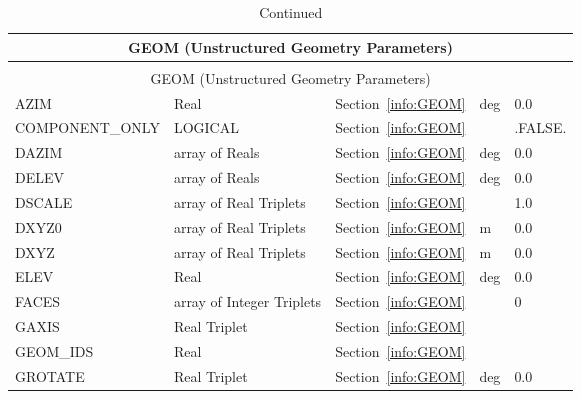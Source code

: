\documentclass[12pt]{article}
\begin{document}
\begin{longtable}{@{\extracolsep{\fill}}|l|l|l|l|l|}
\caption[Unstructured geometry parameters ({\ct GEOM} namelist group)]{For more information see Section~\ref{info:GEOM}.}
\label{tbl:GEOM} \\
\hline
\multicolumn{5}{|c|}{{\ct GEOM} (Unstructured Geometry Parameters)} \\
\hline \hline
\endfirsthead
\caption[]{Continued} \\
\hline
\multicolumn{5}{|c|}{{\ct GEOM} (Unstructured Geometry Parameters)} \\
\hline \hline
\endhead
{\ct AZIM}         & Real                   & Section~\ref{info:GEOM}            &  deg      &    0.0                   \\ \hline
{\ct COMPONENT\_ONLY} & LOGICAL             & Section~\ref{info:GEOM}            &           &  {\ct .FALSE.}           \\ \hline
{\ct DAZIM}        & array of Reals         & Section~\ref{info:GEOM}            &  deg      &    0.0                   \\ \hline
{\ct DELEV}        & array of Reals         & Section~\ref{info:GEOM}            &  deg      &    0.0                   \\ \hline
{\ct DSCALE}       & array of Real Triplets & Section~\ref{info:GEOM}            &           &   1.0                    \\ \hline
{\ct DXYZ0}        & array of Real Triplets & Section~\ref{info:GEOM}            &   m       &   0.0                    \\ \hline
{\ct DXYZ}         & array of Real Triplets & Section~\ref{info:GEOM}            &   m       &   0.0                    \\ \hline
{\ct ELEV}         & Real                   & Section~\ref{info:GEOM}            &  deg      &    0.0                   \\ \hline
{\ct FACES}        & array of Integer Triplets     & Section~\ref{info:GEOM}     &           &    0                     \\ \hline
{\ct GAXIS}        & Real Triplet           & Section~\ref{info:GEOM}            &           &                          \\ \hline
{\ct GEOM\_IDS}    & Real                   & Section~\ref{info:GEOM}            &           &                          \\ \hline
{\ct GROTATE}      & Real Triplet           & Section~\ref{info:GEOM}            &  deg      &    0.0                   \\ \hline

\end{longtable}
\end{document}
